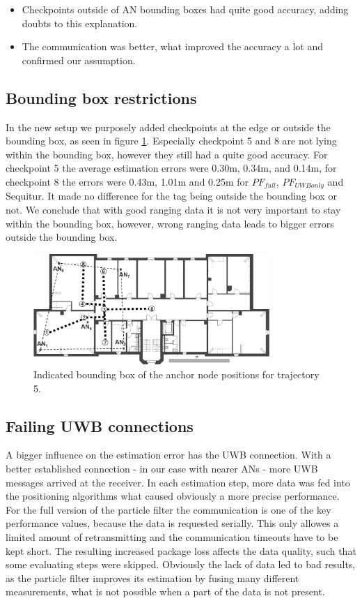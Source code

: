\begin{itemize}
\item Checkpoints outside of AN bounding boxes had quite good accuracy, adding doubts to this explanation.
\item The communication was better, what improved the accuracy a lot and confirmed our assumption.
\end{itemize}

\subsection{Bounding box restrictions}
In the new setup we purposely added checkpoints at the edge or outside the bounding box, as seen in figure \ref{fig:trajectory5_boundingBox}. Especially checkpoint 5 and 8 are not lying within the bounding box, however they still had a quite good accuracy. For checkpoint 5 the average estimation errors were 0.30m, 	0.34m, and 0.14m, for checkpoint 8 the errors were 0.43m,	1.01m and 0.25m for $PF_{full}$, $PF_{UWBonly}$ and Sequitur. It made no difference for the tag being outside the bounding box or not. We conclude that with good ranging data it is not very important to stay within the bounding box, however, wrong ranging data leads to bigger errors outside the bounding box.

\begin{figure}[th]
\centering
\includegraphics[width=0.8\textwidth]{Figures/trajectory5_boundingBox}
\decoRule
\caption[Trajectory 5 with bounding box]{Indicated bounding box of the anchor node positions for trajectory 5.}
\label{fig:trajectory5_boundingBox}
\end{figure}

\subsection{Failing UWB connections}
A bigger influence on the estimation error has the UWB connection. With a better established connection - in our case with nearer ANs - more UWB messages arrived at the receiver. In each estimation step, more data was fed into the positioning algorithms what caused obviously a more precise performance. For the full version of the particle filter the communication is one of the key performance values, because the data is requested serially. This only allowes a limited amount of retransmitting and the communication timeouts have to be kept short. The resulting increased package loss affects the data quality,  such that some evaluating steps were skipped. Obviously the lack of data led to bad results, as the particle filter improves its estimation by fusing many different measurements, what is not possible when a part of the data is not present. 
